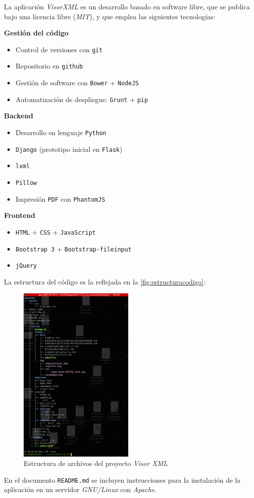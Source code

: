 \documentclass[10pt,notitlepage,oneside,a4paper]{article}
\begin{document}
La aplicación \textit{VisorXML} es un desarrollo basado en software libre, que se publica bajo una licencia libre (\textit{MIT}), y que emplea las siguientes tecnologías:

\textbf{Gestión del código}

\begin{itemize}
\item Control de versiones con \texttt{git}
\item Repositorio en \texttt{github}
\item Gestión de software con \texttt{Bower} + \texttt{NodeJS}
\item Automatización de despliegue: \texttt{Grunt} + \texttt{pip}
\end{itemize}

\textbf{Backend}

\begin{itemize}
\item Desarrollo en lenguaje \texttt{Python}
\item \texttt{Django} (prototipo inicial en \texttt{Flask})
\item \texttt{lxml}
\item \texttt{Pillow}
\item Impresión \texttt{PDF} con \texttt{PhantomJS}
\end{itemize}

\textbf{Frontend}

\begin{itemize}
\item \texttt{HTML} + \texttt{CSS} + \texttt{JavaScript}
\item \texttt{Bootstrap 3} + \texttt{Bootstrap-fileinput}
\item \texttt{jQuery}
\end{itemize}

La estructura del código es la reflejada en la \autoref{fig:estructuracodigo}:

\begin{figure}[H]
  \centering
  \includegraphics[width=0.5\textwidth]{imagenes/visorxml_estructura}  
  \caption{Estructura de archivos del proyecto \textit{Visor XML}}
  \label{fig:estructuracodigo}
\end{figure}

En el documento \texttt{README.md} se incluyen instrucciones para la instalación de la aplicación en un servidor \textit{GNU/Linux} con \textit{Apache}.
\end{document}
